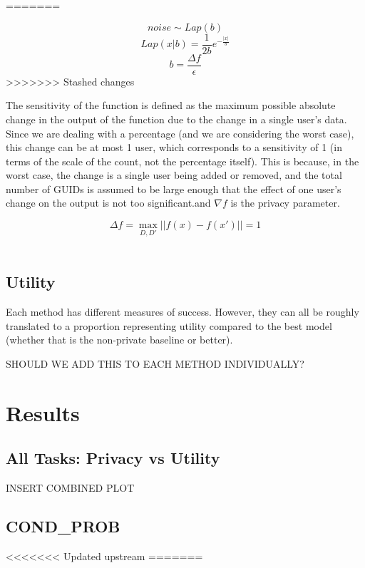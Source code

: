 \documentclass[12pt,letterpaper]{article}
\begin{document}
\begin{table}[h]
=======


$$noise \sim Lap(b) $$
$$Lap(x|b) = \frac{1}{2b}e^{-\frac{|x|}{b}}$$
$$b = \frac{\Delta f}{\epsilon}$$
>>>>>>> Stashed changes

The sensitivity of the function is defined as the maximum possible absolute change in the output of the function due to the change in a single user's data. Since we are dealing with a percentage (and we are considering the worst case), this change can be at most 1 user, which corresponds to a sensitivity of 1 (in terms of the scale of the count, not the percentage itself). This is because, in the worst case, the change is a single user being added or removed, and the total number of GUIDs is assumed to be large enough that the effect of one user's change on the output is not too significant.and $\nabla f$ is the privacy parameter. 
\begin{center}
$$\Delta f = \max_{D, D'} ||f(x) - f(x')|| = 1$$ \\
\end{center}

\subsection{Utility}

Each method has different measures of success. However, they can all be roughly translated to a proportion representing utility compared to the best model (whether that is the non-private baseline or better). 

SHOULD WE ADD THIS TO EACH METHOD INDIVIDUALLY?


\section{Results}

\subsection{All Tasks: Privacy vs Utility}

INSERT COMBINED PLOT

\subsection{COND\_PROB}
<<<<<<< Updated upstream
=======


\end{table}
\end{document}
